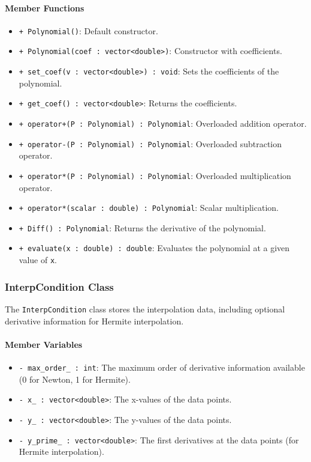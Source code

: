 \documentclass{article}
\begin{document}
\paragraph{Member Functions}

\begin{itemize}
    \item \texttt{+ Polynomial()}: Default constructor.
    \item \texttt{+ Polynomial(coef : vector<double>)}: Constructor with coefficients.
    \item \texttt{+ set\_coef(v : vector<double>) : void}: Sets the coefficients of the polynomial.
    \item \texttt{+ get\_coef() : vector<double>}: Returns the coefficients.
    \item \texttt{+ operator+(P : Polynomial) : Polynomial}: Overloaded addition operator.
    \item \texttt{+ operator-(P : Polynomial) : Polynomial}: Overloaded subtraction operator.
    \item \texttt{+ operator*(P : Polynomial) : Polynomial}: Overloaded multiplication operator.
    \item \texttt{+ operator*(scalar : double) : Polynomial}: Scalar multiplication.
    \item \texttt{+ Diff() : Polynomial}: Returns the derivative of the polynomial.
    \item \texttt{+ evaluate(x : double) : double}: Evaluates the polynomial at a given value of \texttt{x}.
\end{itemize}

\subsubsection{InterpCondition Class}

The \texttt{InterpCondition} class stores the interpolation data, including optional derivative information for Hermite interpolation.

\paragraph{Member Variables}

\begin{itemize}
    \item \texttt{- max\_order\_ : int}: The maximum order of derivative information available (0 for Newton, 1 for Hermite).
    \item \texttt{- x\_ : vector<double>}: The x-values of the data points.
    \item \texttt{- y\_ : vector<double>}: The y-values of the data points.
    \item \texttt{- y\_prime\_ : vector<double>}: The first derivatives at the data points (for Hermite interpolation).
\end{itemize}
\end{document}
